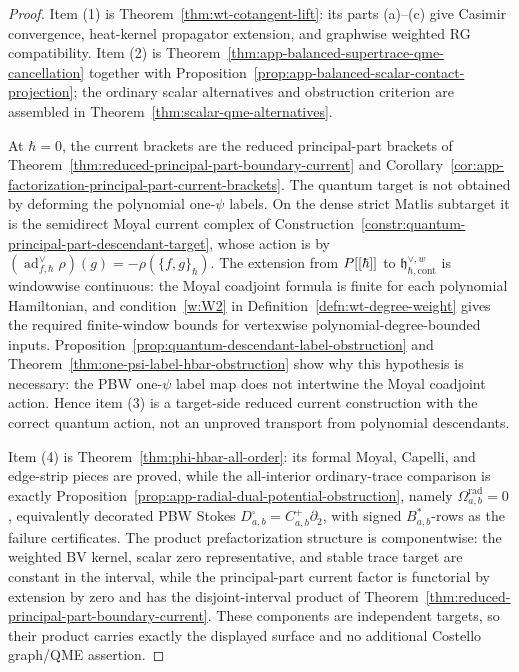\documentclass[11pt]{memoir}
\begin{document}
\begin{proof}
  Item (1) is Theorem~\ref{thm:wt-cotangent-lift}: its parts (a)--(c)
  give Casimir convergence, heat-kernel propagator extension, and
  graphwise weighted RG compatibility.  Item (2) is
  Theorem~\ref{thm:app-balanced-supertrace-qme-cancellation} together
  with
  Proposition~\ref{prop:app-balanced-scalar-contact-projection}; the
  ordinary scalar alternatives and obstruction criterion are assembled in
  Theorem~\ref{thm:scalar-qme-alternatives}.

  At \(\hbar=0\), the current brackets are the reduced principal-part
  brackets of Theorem~\ref{thm:reduced-principal-part-boundary-current}
  and Corollary~\ref{cor:app-factorization-principal-part-current-brackets}.
  The quantum target is not obtained by deforming the polynomial
  one-\(\psi\) labels.  On the dense strict Matlis subtarget it is the
  semidirect Moyal current complex of
  Construction~\ref{constr:quantum-principal-part-descendant-target},
  whose action is by
  \((\operatorname{ad}^{\vee}_{f,\hbar}\rho)(g)=-\rho(\{f,g\}_\hbar)\).
  The extension from \(P[[\hbar]]\) to
  \(\mathfrak h^{\vee,w}_{\hbar,\mathrm{cont}}\) is windowwise continuous:
  the Moyal coadjoint formula is finite for each polynomial Hamiltonian,
  and condition~\ref{w:W2} in Definition~\ref{defn:wt-degree-weight}
  gives the required finite-window bounds for vertexwise
  polynomial-degree-bounded inputs.
  Proposition~\ref{prop:quantum-descendant-label-obstruction} and
  Theorem~\ref{thm:one-psi-label-hbar-obstruction} show why this
  hypothesis is necessary: the PBW one-\(\psi\) label map does not
  intertwine the Moyal coadjoint action.  Hence item (3) is a
  target-side reduced current construction with the correct quantum
  action, not an unproved transport from polynomial descendants.

  Item (4) is Theorem~\ref{thm:phi-hbar-all-order}: its formal Moyal,
  Capelli, and edge-strip pieces are proved, while the all-interior
  ordinary-trace comparison is exactly
  Proposition~\ref{prop:app-radial-dual-potential-obstruction}, namely
  \(\Omega^{\mathrm{rad}}_{a,b}=0\), equivalently decorated PBW Stokes
  \(D^\square_{a,b}=C^+_{a,b}\partial_2\), with signed
  \(B_{a,b}^*\)-rows as the failure certificates.  The product
  prefactorization structure is componentwise: the weighted BV kernel,
  scalar zero representative, and stable trace target are constant in
  the interval, while the principal-part current factor is functorial by
  extension by zero and has the disjoint-interval product of
  Theorem~\ref{thm:reduced-principal-part-boundary-current}.  These
  components are independent targets, so their product carries exactly
  the displayed surface and no additional Costello graph/QME assertion.
\end{proof}
\end{document}
